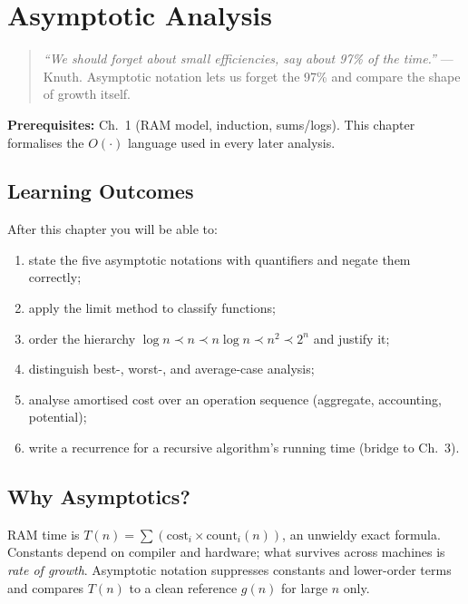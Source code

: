 \chapter{Asymptotic Analysis}
\label{ch:asymptotics}

\begin{quote}
\emph{``We should forget about small efficiencies, say about 97\% of the time.''} --- Knuth. Asymptotic notation lets us forget the 97\% and compare the shape of growth itself.
\end{quote}

\noindent\textbf{Prerequisites:} Ch.~1 (RAM model, induction, sums/logs). This chapter formalises the $O(\cdot)$ language used in every later analysis.

\section*{Learning Outcomes}
After this chapter you will be able to:
\begin{enumerate}[label=(L\arabic*)]
    \item state the five asymptotic notations with quantifiers and negate them correctly;
    \item apply the limit method to classify functions;
    \item order the hierarchy $\log n \prec n \prec n\log n \prec n^{2}\prec 2^{n}$ and justify it;
    \item distinguish best-, worst-, and average-case analysis;
    \item analyse amortised cost over an operation sequence (aggregate, accounting, potential);
    \item write a recurrence for a recursive algorithm's running time (bridge to Ch.~3).
\end{enumerate}

\section{Why Asymptotics?}
\label{sec:why-asymptotics}
RAM time is $T(n)=\sum (\text{cost}_{i}\times\text{count}_{i}(n))$, an unwieldy exact formula. Constants depend on compiler and hardware; what survives across machines is \emph{rate of growth}. Asymptotic notation suppresses constants and lower-order terms and compares $T(n)$ to a clean reference $g(n)$ for large $n$ only.

